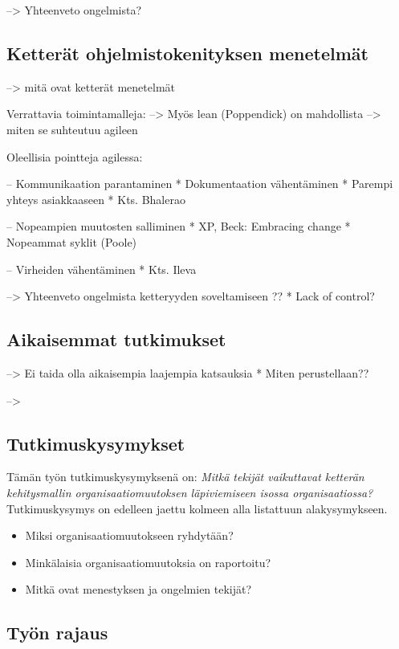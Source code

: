 --> Yhteenveto ongelmista?




\subsection{Ketterät ohjelmistokenityksen menetelmät}

--> mitä ovat ketterät menetelmät

Verrattavia toimintamalleja:
--> Myös lean (Poppendick) on mahdollista
--> miten se suhteutuu agileen


Oleellisia pointteja agilessa:

-- Kommunikaation parantaminen
  * Dokumentaation vähentäminen
  * Parempi yhteys asiakkaaseen
  * Kts. Bhalerao

-- Nopeampien muutosten salliminen
  * XP, Beck: Embracing change
  * Nopeammat syklit (Poole)
 
-- Virheiden vähentäminen
  * Kts. Ileva

--> Yhteenveto ongelmista ketteryyden soveltamiseen ??
  * Lack of control?


\subsection{Aikaisemmat tutkimukset}

--> Ei taida olla aikaisempia laajempia katsauksia
    * Miten perustellaan??
    
--> 

\subsection{Tutkimuskysymykset}

Tämän työn tutkimuskysymyksenä on: \textit{Mitkä tekijät vaikuttavat ketterän
kehitysmallin organisaatiomuutoksen läpiviemiseen isossa organisaatiossa?}
Tutkimuskysymys on edelleen jaettu kolmeen alla listattuun alakysymykseen.

\begin{itemize}
\item Miksi organisaatiomuutokseen ryhdytään?
\item Minkälaisia organisaatiomuutoksia on raportoitu?
\item Mitkä ovat menestyksen ja ongelmien tekijät?
\end{itemize}

\subsection{Työn rajaus}

